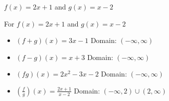 {$f(x) = 2x+1$ and $g(x) = x-2$}
{For $f(x) = 2x+1$ and $g(x) = x-2$

\begin{itemize}
\item $(f+g)(x) = 3x-1$       Domain: $(-\infty, \infty)$
\item $(f-g)(x) = x+3$       Domain:  $(-\infty, \infty)$
\item $(fg)(x) = 2x^2-3x-2$       Domain: $(-\infty, \infty)$
\item $\left(\frac{f}{g}\right)(x) = \frac{2x+1}{x-2}$       Domain:  $(-\infty, 2) \cup (2, \infty)$
\end{itemize}
}